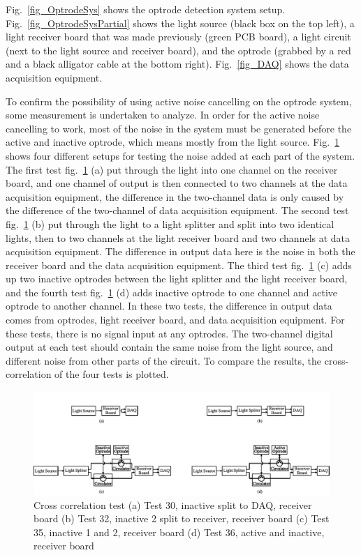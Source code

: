 Fig.~\ref{fig_OptrodeSys} shows the optrode detection system setup.  Fig.~\ref{fig_OptrodeSysPartial} shows the light source (black box on the top left), a light receiver board that was made previously (green PCB board), a light circuit (next to the light source and receiver board), and the optrode (grabbed by a red and a black alligator cable at the bottom right).  Fig.~\ref{fig_DAQ} shows the data acquisition equipment.

To confirm the possibility of using active noise cancelling on the optrode system, some measurement is undertaken to analyze.  In order for the active noise cancelling to work, most of the noise in the system must be generated before the active and inactive optrode, which means mostly from the light source.  Fig.~\ref{fig_CrossCoTest} shows four different setups for testing the noise added at each part of the system.  The first test fig.~\ref{fig_CrossCoTest} (a) put through the light into one channel on the receiver board, and one channel of output is then connected to two channels at the data acquisition equipment, the difference in the two-channel data is only caused by the difference of the two-channel of data acquisition equipment.  The second test fig.~\ref{fig_CrossCoTest} (b) put through the light to a light splitter and split into two identical lights, then to two channels at the light receiver board and two channels at data acquisition equipment.  The difference in output data here is the noise in both the receiver board and the data acquisition equipment.  The third test fig.~\ref{fig_CrossCoTest} (c) adds up two inactive optrodes between the light splitter and the light receiver board, and the fourth test fig.~\ref{fig_CrossCoTest} (d) adds inactive optrode to one channel and active optrode to another channel.  In these two tests, the difference in output data comes from optrodes, light receiver board, and data acquisition equipment.  For these tests, there is no signal input at any optrodes.  The two-channel digital output at each test should contain the same noise from the light source, and different noise from other parts of the circuit.  To compare the results, the cross-correlation of the four tests is plotted.

\begin{figure}[h]
\centering
\includegraphics[width=0.9\linewidth]{4-ANC_Sys/CrossCoTest.pdf}
\caption{Cross correlation test (a) Test 30, inactive split to DAQ, receiver board (b) Test 32, inactive 2 split to receiver, receiver board (c) Test 35, inactive 1 and 2, receiver board (d) Test 36, active and inactive, receiver board}
\label{fig_CrossCoTest}
\end{figure}

